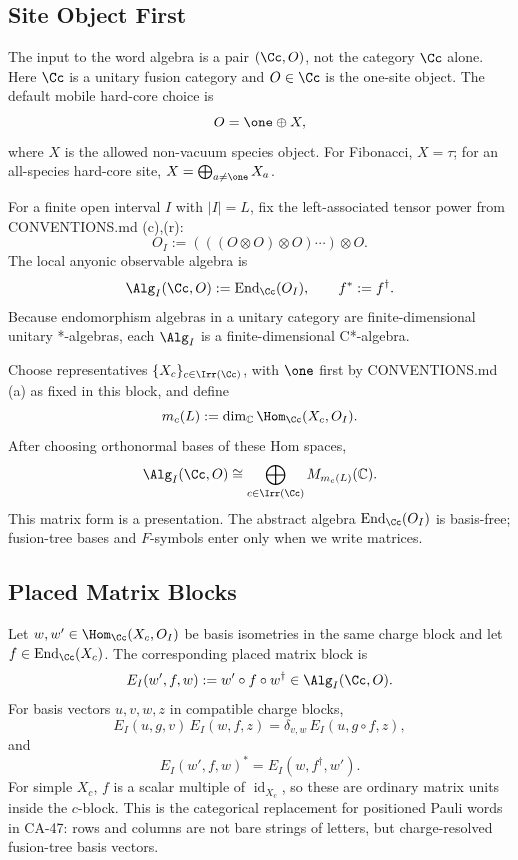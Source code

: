 \subsection{Site Object First}

The input to the word algebra is a pair \((\Cc,O)\), not the category \(\Cc\)
alone.  Here \(\Cc\) is a unitary fusion category and \(O\in\Cc\) is the
one-site object.  The default mobile hard-core choice is
\[
  O=\one\oplus X,
\]
where \(X\) is the allowed non-vacuum species object.  For Fibonacci,
\(X=\tau\); for an all-species hard-core site, \(X=\bigoplus_{a\neq\one}X_a\).

For a finite open interval \(I\) with \(|I|=L\), fix the left-associated tensor
power from CONVENTIONS.md (c),(r):
\[
  O_I := (((O\otimes O)\otimes O)\cdots)\otimes O .
\]
The local anyonic observable algebra is
\[
  \Alg_I(\Cc,O):=\operatorname{End}_{\Cc}(O_I),
  \qquad f^*:=f^\dagger .
\]
Because endomorphism algebras in a unitary category are finite-dimensional
unitary *-algebras, each \(\Alg_I\) is a finite-dimensional C*-algebra.

Choose representatives \(\{X_c\}_{c\in\Irr(\Cc)}\), with \(\one\) first by
CONVENTIONS.md (a) as fixed in this block, and define
\[
  m_c(L):=\dim_{\mathbb C}\Hom_{\Cc}(X_c,O_I).
\]
After choosing orthonormal bases of these Hom spaces,
\[
  \Alg_I(\Cc,O)\cong \bigoplus_{c\in\Irr(\Cc)} M_{m_c(L)}(\mathbb C).
\]
This matrix form is a presentation.  The abstract algebra
\(\operatorname{End}_{\Cc}(O_I)\) is basis-free; fusion-tree bases and
\(F\)-symbols enter only when we write matrices.

\subsection{Placed Matrix Blocks}

Let \(w,w'\in\Hom_{\Cc}(X_c,O_I)\) be basis isometries in the same charge block
and let \(f\in\operatorname{End}_{\Cc}(X_c)\).  The corresponding placed matrix
block is
\[
  E_I(w',f,w):=w'\circ f\circ w^\dagger\in\Alg_I(\Cc,O).
\]
For basis vectors \(u,v,w,z\) in compatible charge blocks,
\[
  E_I(u,g,v)\,E_I(w,f,z)
  =
  \delta_{v,w}\,E_I(u,g\circ f,z),
\]
and
\[
  E_I(w',f,w)^*=E_I(w,f^\dagger,w').
\]
For simple \(X_c\), \(f\) is a scalar multiple of \(\operatorname{id}_{X_c}\),
so these are ordinary matrix units inside the \(c\)-block.  This is the
categorical replacement for positioned Pauli words in CA-47: rows and columns
are not bare strings of letters, but charge-resolved fusion-tree basis vectors.

